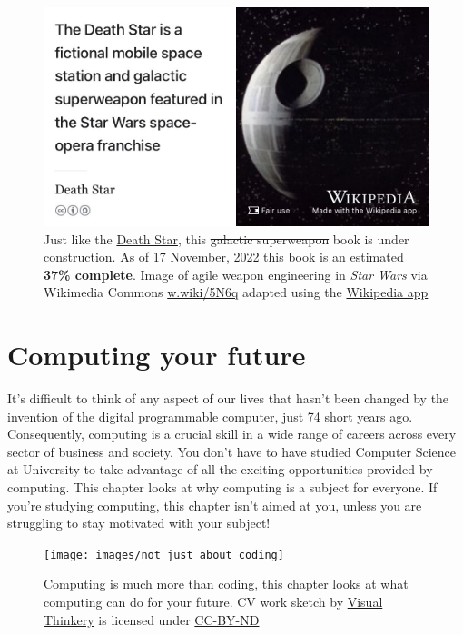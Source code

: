 \documentclass[
]{book}
\begin{document}
\begin{figure}

{\centering \includegraphics[width=0.99\linewidth]{images/DeathStar2} 

}

\caption{Just like the \href{https://en.wikipedia.org/wiki/Death_Star}{Death Star}, this \sout{galactic superweapon} book is under construction. As of 17 November, 2022 this book is an estimated \textbf{37\% complete}. Image of agile weapon engineering in \emph{Star Wars} via Wikimedia Commons \href{https://w.wiki/5N6q}{w.wiki/5N6q} adapted using the \href{https://apps.apple.com/gb/app/wikipedia/id324715238}{Wikipedia app}}\label{fig:deathstar2-fig}
\end{figure}

\hypertarget{computing}{%
\chapter{Computing your future}\label{computing}}

It's difficult to think of any aspect of our lives that hasn't been changed by the invention of the digital programmable computer, just 74 short years ago. \citep{lavington} Consequently, computing is a crucial skill in a wide range of careers across every sector of business and society. You don't have to have studied Computer Science at University to take advantage of all the exciting opportunities provided by computing. This chapter looks at why computing is a subject for everyone. If you're studying computing, this chapter isn't aimed at you, unless you are struggling to stay motivated with your subject! 👨🏿‍💻👨‍💻👩🏽‍💻👩‍💻👨🏿‍💻

\begin{figure}

{\centering \texttt{[image: images/not just about coding]} 

}

\caption{Computing is much more than coding, this chapter looks at what computing can do for your future. CV work sketch by \href{https://visualthinkery.com}{Visual Thinkery} is licensed under \href{https://creativecommons.org/licenses/by-nd/4.0/}{CC-BY-ND}}\label{fig:not-coding-fig}
\end{figure}
\end{document}
